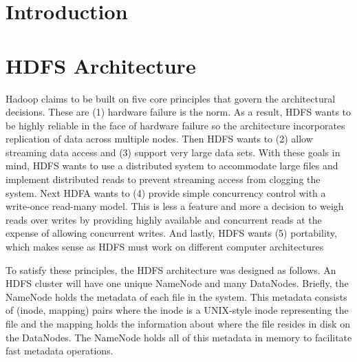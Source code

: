 \documentclass[11pt, a4paper]{article}
\author{\theauthor}
\title{\thetitle}
\date{\duedate}
\begin{document}
\maketitle
\thispagestyle{empty}

\begin{abstract}
\end{abstract}
\begin{multicols*}{2}


\section{Introduction}



\section{HDFS Architecture}


Hadoop claims to be built on five core principles that govern the architectural decisions. These are (1) hardware failure is the norm. As a result, HDFS wants to be highly reliable in the face of hardware failure so the architecture incorporates replication of data across multiple nodes. Then HDFS wants to (2) allow streaming data access and (3) support very large data sets. With these goals in mind, HDFS wants to use a distributed system to accommodate large files and implement distributed reads to prevent streaming access from clogging the system. Next HDFA wants to (4) provide simple concurrency control with a write-once read-many model. This is less a feature and more a decision to weigh reads over writes by providing highly available and concurrent reads at the expense of allowing concurrent writes. And lastly, HDFS wants (5) portability, which makes sense as HDFS must work on different computer architectures 


To satisfy these principles, the HDFS architecture was designed as follows. An HDFS cluster will have one unique NameNode and many DataNodes. Briefly, the NameNode holds the metadata of each file in the system. This metadata consists of (inode, mapping) pairs where the inode is a UNIX-style inode representing the file and the mapping holds the information about where the file resides in disk on the DataNodes. The NameNode holds all of this metadata in memory to facilitate fast metadata operations. 


\end{multicols*}
\end{document}
